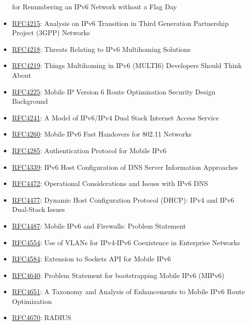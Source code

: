 \documentclass[
]{article}
\begin{document}
\begin{itemize}
  for Renumbering an IPv6 Network without a Flag Day
\item
  \href{https://www.rfc-editor.org/info/rfc4215}{RFC4215}: Analysis on
  IPv6 Transition in Third Generation Partnership Project (3GPP)
  Networks
\item
  \href{https://www.rfc-editor.org/info/rfc4218}{RFC4218}: Threats
  Relating to IPv6 Multihoming Solutions
\item
  \href{https://www.rfc-editor.org/info/rfc4219}{RFC4219}: Things
  Multihoming in IPv6 (MULTI6) Developers Should Think About
\item
  \href{https://www.rfc-editor.org/info/rfc4225}{RFC4225}: Mobile IP
  Version 6 Route Optimization Security Design Background
\item
  \href{https://www.rfc-editor.org/info/rfc4241}{RFC4241}: A Model of
  IPv6/IPv4 Dual Stack Internet Access Service
\item
  \href{https://www.rfc-editor.org/info/rfc4260}{RFC4260}: Mobile IPv6
  Fast Handovers for 802.11 Networks
\item
  \href{https://www.rfc-editor.org/info/rfc4285}{RFC4285}:
  Authentication Protocol for Mobile IPv6
\item
  \href{https://www.rfc-editor.org/info/rfc4339}{RFC4339}: IPv6 Host
  Configuration of DNS Server Information Approaches
\item
  \href{https://www.rfc-editor.org/info/rfc4472}{RFC4472}: Operational
  Considerations and Issues with IPv6 DNS
\item
  \href{https://www.rfc-editor.org/info/rfc4477}{RFC4477}: Dynamic Host
  Configuration Protocol (DHCP): IPv4 and IPv6 Dual-Stack Issues
\item
  \href{https://www.rfc-editor.org/info/rfc4487}{RFC4487}: Mobile IPv6
  and Firewalls: Problem Statement
\item
  \href{https://www.rfc-editor.org/info/rfc4554}{RFC4554}: Use of VLANs
  for IPv4-IPv6 Coexistence in Enterprise Networks
\item
  \href{https://www.rfc-editor.org/info/rfc4584}{RFC4584}: Extension to
  Sockets API for Mobile IPv6
\item
  \href{https://www.rfc-editor.org/info/rfc4640}{RFC4640}: Problem
  Statement for bootstrapping Mobile IPv6 (MIPv6)
\item
  \href{https://www.rfc-editor.org/info/rfc4651}{RFC4651}: A Taxonomy
  and Analysis of Enhancements to Mobile IPv6 Route Optimization
\item
  \href{https://www.rfc-editor.org/info/rfc4670}{RFC4670}: RADIUS

\end{itemize}
\end{document}
